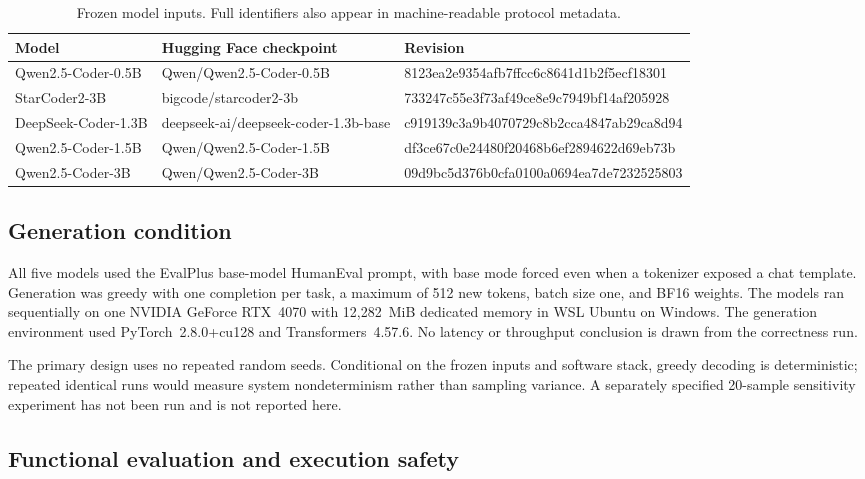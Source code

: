 \documentclass[10pt,twocolumn]{article}
\begin{document}
\begin{table}[t]
\centering
\caption{Frozen model inputs. Full identifiers also appear in machine-readable protocol metadata.}
\label{tab:models}
\small
\begin{tabularx}{\textwidth}{@{}l l >{\ttfamily\scriptsize}X@{}}
\toprule
Model & Hugging Face checkpoint & \normalfont Revision \\
\midrule
Qwen2.5-Coder-0.5B & Qwen/Qwen2.5-Coder-0.5B & 8123ea2e9354afb7ffcc6c8641d1b2f5ecf18301 \\
StarCoder2-3B & bigcode/starcoder2-3b & 733247c55e3f73af49ce8e9c7949bf14af205928 \\
DeepSeek-Coder-1.3B & deepseek-ai/deepseek-coder-1.3b-base & c919139c3a9b4070729c8b2cca4847ab29ca8d94 \\
Qwen2.5-Coder-1.5B & Qwen/Qwen2.5-Coder-1.5B & df3ce67c0e24480f20468b6ef2894622d69eb73b \\
Qwen2.5-Coder-3B & Qwen/Qwen2.5-Coder-3B & 09d9bc5d376b0cfa0100a0694ea7de7232525803 \\
\bottomrule
\end{tabularx}
\end{table}

\subsection{Generation condition}

All five models used the EvalPlus base-model HumanEval prompt, with base mode forced even when a tokenizer exposed a chat template. Generation was greedy with one completion per task, a maximum of 512 new tokens, batch size one, and BF16 weights. The models ran sequentially on one NVIDIA GeForce RTX~4070 with 12,282~MiB dedicated memory in WSL Ubuntu on Windows. The generation environment used PyTorch~2.8.0+cu128 and Transformers~4.57.6. No latency or throughput conclusion is drawn from the correctness run.

The primary design uses no repeated random seeds. Conditional on the frozen inputs and software stack, greedy decoding is deterministic; repeated identical runs would measure system nondeterminism rather than sampling variance. A separately specified 20-sample sensitivity experiment has not been run and is not reported here.

\subsection{Functional evaluation and execution safety}
\end{document}
